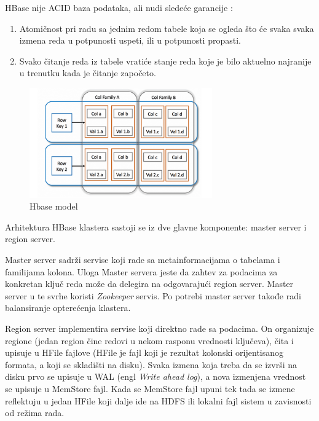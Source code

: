 \documentclass[12pt,oneside]{memoir}
\begin{document}
HBase nije ACID baza podataka, ali nudi sledeće garancije \cite{hbaseACID}: 

\begin{enumerate}
\item[\textbullet] Atomičnost pri radu sa jednim redom tabele koja se ogleda što će svaka  svaka izmena reda u potpunosti uspeti, ili u potpunosti propasti.
\item[\textbullet] Svako čitanje reda iz tabele vratiće stanje reda koje je bilo aktuelno najranije u trenutku kada je čitanje započeto. 
\end{enumerate}

\begin{figure}[!ht]
  \centering
  \includegraphics[width=0.7\textwidth]{colFamily.png}
  \caption{Hbase model}
  \label{fig:grafikon}
\end{figure}

Arhitektura HBase klastera sastoji se iz dve glavne komponente:  master server i region server. 

Master server  sadrži servise koji rade sa metainformacijama o tabelama i familijama kolona. Uloga Master servera jeste da zahtev za podacima za konkretan ključ reda može da delegira na odgovarajući region server. Master server u te svrhe koristi \textit{Zookeeper} \cite{BigTable} servis. Po potrebi master server takođe radi balansiranje opterećenja klastera. 

Region server implementira servise koji direktno rade sa podacima. On organizuje regione (jedan region čine redovi u nekom rasponu vrednosti ključeva), čita i upisuje u HFile fajlove (HFile je fajl koji je rezultat kolonski orijentisanog formata, a koji se skladišti na disku). Svaka izmena koja treba da se izvrši na disku prvo se upisuje u WAL (engl \textit{Write ahead log}), a nova izmenjena vrednost se upisuje u MemStore fajl. Kada se MemStore fajl upuni tek tada se izmene reflektuju u jedan HFile koji dalje ide na HDFS ili lokalni fajl sistem u zavisnosti od režima rada. 
\end{document}
